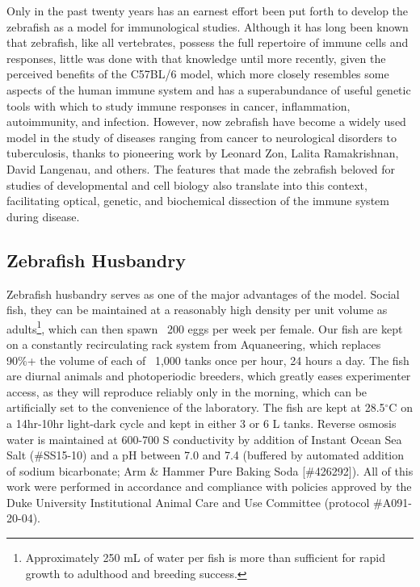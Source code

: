Only in the past twenty years has an earnest effort been put forth to develop the zebrafish as a model for immunological studies. Although it has long been known that zebrafish, like all vertebrates, possess the full repertoire of immune cells and responses, little was done with that knowledge until more recently, given the perceived benefits of the C57BL/6 model, which more closely resembles some aspects of the human immune system and has a superabundance of useful genetic tools with which to study immune responses in cancer, inflammation, autoimmunity, and infection. However, now zebrafish have become a widely used model in the study of diseases ranging from cancer to neurological disorders to tuberculosis, thanks to pioneering work by Leonard Zon, Lalita Ramakrishnan, David Langenau, and others. The features that made the zebrafish beloved for studies of developmental and cell biology also translate into this context, facilitating optical, genetic, and biochemical dissection of the immune system during disease.

\subsection{Zebrafish Husbandry}

Zebrafish husbandry serves as one of the major advantages of the model. Social fish, they can be maintained at a reasonably high density per unit volume as adults\footnote{Approximately 250 mL of water per fish is more than sufficient for rapid growth to adulthood and breeding success.}, which can then spawn ~200 eggs per week per female. Our fish are kept on a constantly recirculating rack system from Aquaneering, which replaces 90\%+ the volume of each of ~1,000 tanks once per hour, 24 hours a day. The fish are diurnal animals and photoperiodic breeders, which greatly eases experimenter access, as they will reproduce reliably only in the morning, which can be artificially set to the convenience of the laboratory. The fish are kept at 28.5$^{\circ}$C on a 14hr-10hr light-dark cycle and kept in either 3 or 6 L tanks. Reverse osmosis water is maintained at 600-700 \textmu S conductivity by addition of Instant Ocean Sea Salt (\#SS15-10) and a pH between 7.0 and 7.4 (buffered by automated addition of sodium bicarbonate; Arm \& Hammer Pure Baking Soda [\#426292]). All of this work were performed in accordance and compliance with policies approved by the Duke University Institutional Animal Care and Use Committee (protocol \#A091-20-04).


